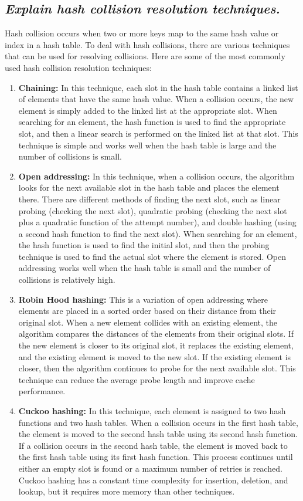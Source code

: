 \documentclass{article}
\begin{document}
\subsection{\textit{Explain hash collision resolution techniques.}}
Hash collision occurs when two or more keys map to the same hash value or index in a hash table. To deal with hash collisions, there are various techniques that can be used for resolving collisions. Here are some of the most commonly used hash collision resolution techniques:
\begin{enumerate}
	\item \textbf{Chaining:} In this technique, each slot in the hash table contains a linked list of elements that have the same hash value. When a collision occurs, the new element is simply added to the linked list at the appropriate slot. When searching for an element, the hash function is used to find the appropriate slot, and then a linear search is performed on the linked list at that slot. This technique is simple and works well when the hash table is large and the number of collisions is small.
	\item \textbf{Open addressing:} In this technique, when a collision occurs, the algorithm looks for the next available slot in the hash table and places the element there. There are different methods of finding the next slot, such as linear probing (checking the next slot), quadratic probing (checking the next slot plus a quadratic function of the attempt number), and double hashing (using a second hash function to find the next slot). When searching for an element, the hash function is used to find the initial slot, and then the probing technique is used to find the actual slot where the element is stored. Open addressing works well when the hash table is small and the number of collisions is relatively high.
	\item \textbf{Robin Hood hashing:} This is a variation of open addressing where elements are placed in a sorted order based on their distance from their original slot. When a new element collides with an existing element, the algorithm compares the distances of the elements from their original slots. If the new element is closer to its original slot, it replaces the existing element, and the existing element is moved to the new slot. If the existing element is closer, then the algorithm continues to probe for the next available slot. This technique can reduce the average probe length and improve cache performance.
	\item \textbf{Cuckoo hashing:} In this technique, each element is assigned to two hash functions and two hash tables. When a collision occurs in the first hash table, the element is moved to the second hash table using its second hash function. If a collision occurs in the second hash table, the element is moved back to the first hash table using its first hash function. This process continues until either an empty slot is found or a maximum number of retries is reached. Cuckoo hashing has a constant time complexity for insertion, deletion, and lookup, but it requires more memory than other techniques.
\end{enumerate}
\end{document}
